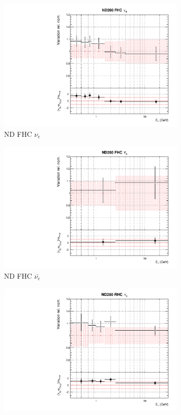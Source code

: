 \begin{figure}
\begin{subfigure}{0.24\textwidth}
\end{subfigure}
\begin{subfigure}{0.24\textwidth}
  \centering
  \includegraphics[width=0.95\linewidth]{figs/datflux2}
  \caption{ND FHC $\nu_{e}$}
\end{subfigure}
\begin{subfigure}{0.24\textwidth}
  \centering
  \includegraphics[width=0.95\linewidth]{figs/datflux3}
  \caption{ND FHC $\bar{\nu_{e}}$}
\end{subfigure}
\begin{subfigure}{0.24\textwidth}
  \centering
  \includegraphics[width=0.95\linewidth]{figs/datflux4}

\end{subfigure}
\end{figure}
